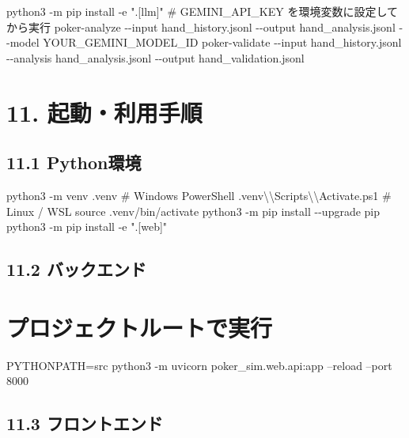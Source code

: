 \documentclass[
]{article}
\newenvironment{Shaded}{}{}
\newcommand{\NormalTok}[1]{#1}
\begin{document}
\begin{Shaded}
\begin{Highlighting}[]
\NormalTok{python3 {-}m pip install {-}e ".[llm]"}
\NormalTok{\# GEMINI\_API\_KEY を環境変数に設定してから実行}
\NormalTok{poker{-}analyze {-}{-}input hand\_history.jsonl {-}{-}output hand\_analysis.jsonl {-}{-}model YOUR\_GEMINI\_MODEL\_ID}
\NormalTok{poker{-}validate {-}{-}input hand\_history.jsonl {-}{-}analysis hand\_analysis.jsonl {-}{-}output hand\_validation.jsonl}
\end{Highlighting}
\end{Shaded}

\section{11. 起動・利用手順}\label{ux8d77ux52d5ux5229ux7528ux624bux9806}

\subsection{11.1 Python環境}\label{pythonux74b0ux5883}

\begin{Shaded}
\begin{Highlighting}[]
\NormalTok{python3 {-}m venv .venv}
\NormalTok{\# Windows PowerShell}
\NormalTok{.venv\textbackslash{}\textbackslash{}Scripts\textbackslash{}\textbackslash{}Activate.ps1}
\NormalTok{\# Linux / WSL}
\NormalTok{source .venv/bin/activate}
\NormalTok{python3 {-}m pip install {-}{-}upgrade pip}
\NormalTok{python3 {-}m pip install {-}e ".[web]"}
\end{Highlighting}
\end{Shaded}

\subsection{11.2
バックエンド}\label{ux30d0ux30c3ux30afux30a8ux30f3ux30c9}

\section{プロジェクトルートで実行}\label{ux30d7ux30edux30b8ux30a7ux30afux30c8ux30ebux30fcux30c8ux3067ux5b9fux884c}

PYTHONPATH=src python3 -m uvicorn poker\_sim.web.api:app --reload --port
8000

\subsection{11.3
フロントエンド}\label{ux30d5ux30edux30f3ux30c8ux30a8ux30f3ux30c9}
\end{document}
